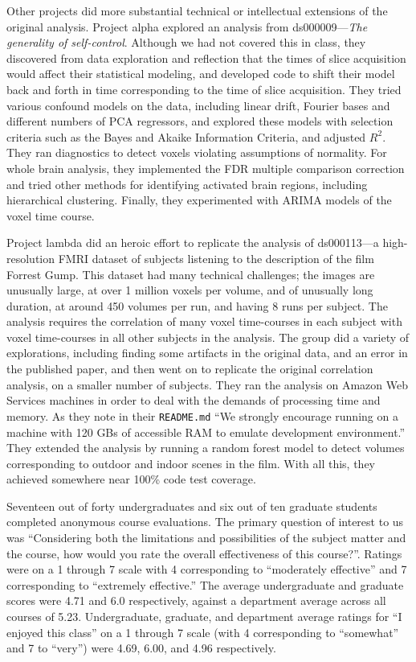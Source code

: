 Other projects did more substantial technical or intellectual extensions of
the original analysis.  Project alpha explored an analysis from
ds000009---\textit{The generality of self-control}.  Although we had not covered this in
class, they discovered from data exploration and reflection that the times of
slice acquisition would affect their statistical modeling, and developed code
to shift their model back and forth in time corresponding to the time of slice
acquisition.  They tried various confound models on the data, including linear
drift, Fourier bases and different numbers of PCA regressors, and explored
these models with selection criteria such as the Bayes and Akaike Information
Criteria, and adjusted $R^2$.  They ran diagnostics to detect voxels violating
assumptions of normality. For whole brain analysis, they implemented the FDR
multiple comparison correction and tried other methods for identifying
activated brain regions, including hierarchical clustering.  Finally, they
experimented with ARIMA models of the voxel time course.

Project lambda did an heroic effort to replicate the analysis of ds000113---a
high-resolution FMRI dataset of subjects listening to the description of the
film Forrest Gump.  This dataset had many technical challenges; the images are
unusually large, at over 1 million voxels per volume, and of unusually long
duration, at around 450 volumes per run, and having 8 runs per subject.  The
analysis requires the correlation of many voxel time-courses in each subject
with voxel time-courses in all other subjects in the analysis.  The group did
a variety of explorations, including finding some artifacts in the original
data, and an error in the published paper, and then went on to replicate the
original correlation analysis, on a smaller number of subjects.  They ran the
analysis on Amazon Web Services machines in order to deal with the demands of
processing time and memory.  As they note in their \texttt{README.md} ``We
strongly encourage running on a machine with 120 GBs of accessible RAM to
emulate development environment.'' They extended the analysis by running a
random forest model to detect volumes corresponding to outdoor and indoor
scenes in the film.  With all this, they achieved somewhere near 100\% code
test coverage.

Seventeen out of forty undergraduates and six out of ten graduate students
completed anonymous course evaluations.  The primary question of interest to
us was ``Considering both the limitations and possibilities of the subject
matter and the course, how would you rate the overall effectiveness of this
course?''.  Ratings were on a 1 through 7 scale with 4 corresponding to
``moderately effective'' and 7 corresponding to ``extremely effective.''
The average undergraduate and graduate scores were
4.71 and 6.0 respectively, against a department average across all courses of
5.23.  Undergraduate, graduate, and department average ratings for ``I enjoyed
this class'' on a 1 through 7 scale (with 4 corresponding to
``somewhat'' and 7 to ``very'')
were 4.69, 6.00, and 4.96 respectively.

